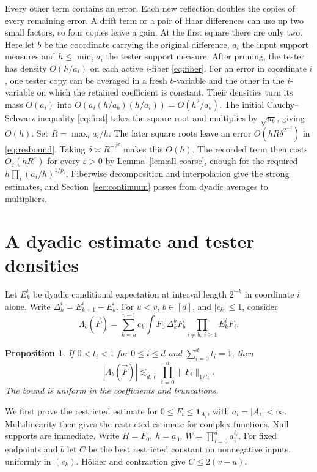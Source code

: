 \documentclass[11pt]{article}
\newtheorem{proposition}[theorem]{Proposition}
\newcommand{\ind}{\mathbf 1}
\begin{document}
Every other term contains an error. Each new reflection doubles the
copies of every remaining error. A drift term or a pair of Haar
differences can use up two small factors, so
four copies leave a gain. At the first square there are only two.
Here let \(b\) be the coordinate carrying the original difference,
\(a_i\) the input support measures and \(h\le\min_i a_i\) the tester
support measure. After pruning, the tester has density \(O(h/a_i)\)
on each active \(i\)-fiber \eqref{eq:fiber}. For an error in coordinate
\(i\), one tester copy can be averaged in a fresh \(b\)-variable and
the other in the \(i\)-variable on which the retained coefficient is
constant. Their densities turn its mass \(O(a_i)\) into
\(O(a_i(h/a_b)(h/a_i))=O(h^2/a_b)\). The initial Cauchy--Schwarz
inequality \eqref{eq:first} takes the square root and multiplies by
\(\sqrt{a_b}\), giving \(O(h)\). Set \(R=\max_i a_i/h\). The later
square roots leave an error \(O(hR\delta^{2^{-d}})\) in \eqref{eq:resbound}.
Taking \(\delta\asymp R^{-2^d}\) makes this \(O(h)\). The recorded term
then costs \(O_{\varepsilon}(hR^\varepsilon)\) for every \(\varepsilon>0\)
by Lemma~\ref{lem:all-coarse}, enough for the required
\(h\prod_i(a_i/h)^{1/p_i}\).
Fiberwise decomposition and interpolation give the strong estimates,
and Section~\ref{sec:continuum} passes from dyadic averages to multipliers.


\section{A dyadic estimate and tester densities}\label{sec:prune}
Let \(E_k^i\) be dyadic conditional expectation at interval length
\(2^{-k}\) in coordinate \(i\) alone. Write
\(\Delta_k^i=E^i_{k+1}-E^i_k\). For \(u<v\), \(b\in[d]\), and
\(|c_k|\le1\), consider
\begin{equation}\label{eq:dyadic}
 \Lambda_b(\vec F)=\sum_{k=u}^{v-1}c_k
     \int F_0\,\Delta_k^b F_b\prod_{i\ne b,\ i\ge1}E_k^i F_i .
\end{equation}
\begin{proposition}\label{prop:dyadic}
If \(0<t_i<1\) for \(0\le i\le d\) and \(\sum_{i=0}^dt_i=1\), then
\[
       |\Lambda_b(\vec F)|\lesssim_{d,\vec t}
                   \prod_{i=0}^d\|F_i\|_{1/t_i}.
\]
The bound is uniform in the coefficients and truncations.
\end{proposition}
We first prove the restricted estimate for \(0\le F_i\le\ind_{A_i}\),
with \(a_i=|A_i|<\infty\). Multilinearity then gives the restricted
estimate for complex functions. Null supports are immediate. Write
\(H=F_0,\ h=a_0,\ W=\prod_{i=0}^d a_i^{t_i}\). For fixed endpoints
and \(b\) let \(C\) be the best restricted constant on nonnegative
inputs, uniformly in \((c_k)\). H\"older and contraction give
\(C\le2(v-u)\).
\end{document}
